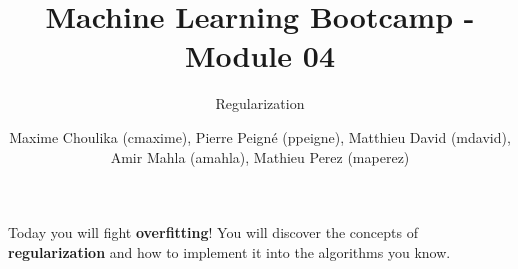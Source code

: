 \documentclass{42-en}
\begin{document}

\title{Machine Learning Bootcamp - Module 04}
\subtitle{Regularization}
\author{
  Maxime Choulika (cmaxime), Pierre Peigné (ppeigne), Matthieu David (mdavid), Amir Mahla (amahla), Mathieu Perez (maperez)
}
\summary
{
  Today you will fight \textbf{overfitting}!
  You will discover the concepts of \textbf{regularization} and how to implement it into the algorithms you know.
}
\maketitle


\newpage
\tableofcontents
\startexercices



\end{document}
